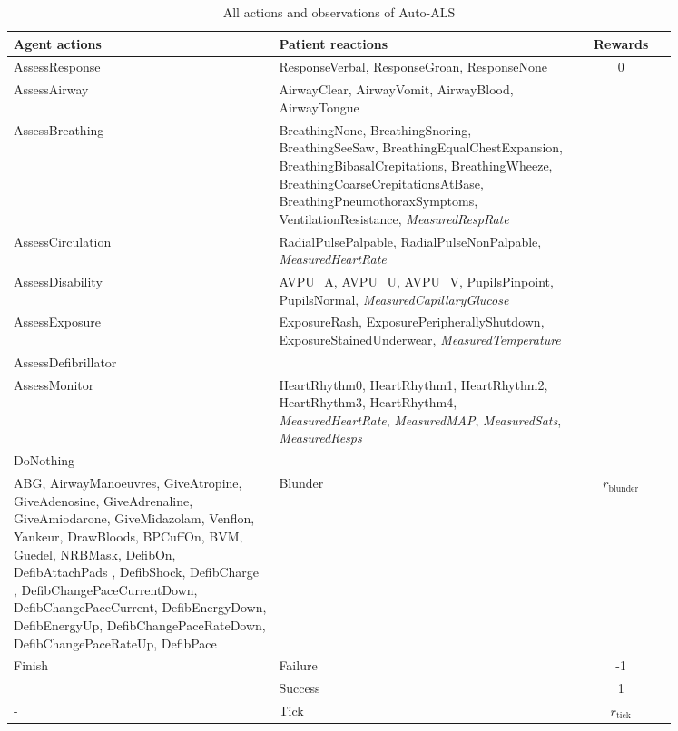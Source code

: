 \begin{table}[H]
\begin{tabular}{|p{0.4\linewidth}|p{0.45\linewidth}|c|}
\toprule
Agent actions &
  Patient reactions & Rewards
   \\
   \midrule
AssessResponse &
  ResponseVerbal,     ResponseGroan,     ResponseNone &
  \multirow{9}{*}{0} \\
AssessAirway &
  AirwayClear,     AirwayVomit,     AirwayBlood,     AirwayTongue &
   \\
AssessBreathing &
  BreathingNone,     BreathingSnoring,     BreathingSeeSaw,     BreathingEqualChestExpansion,     BreathingBibasalCrepitations,     BreathingWheeze,     BreathingCoarseCrepitationsAtBase,     BreathingPneumothoraxSymptoms,  VentilationResistance, \emph{MeasuredRespRate} &
   \\
AssessCirculation &
  RadialPulsePalpable,     RadialPulseNonPalpable, \emph{MeasuredHeartRate} &
   \\
AssessDisability &
  AVPU_A,     AVPU_U,     AVPU_V, PupilsPinpoint,     PupilsNormal, \emph{MeasuredCapillaryGlucose} &
   \\
AssessExposure &
  ExposureRash,     ExposurePeripherallyShutdown,     ExposureStainedUnderwear, \emph{MeasuredTemperature} &
   \\
AssessDefibrillator &
   &
   \\
AssessMonitor &
  HeartRhythm0,     HeartRhythm1,     HeartRhythm2,     HeartRhythm3,     HeartRhythm4, \emph{MeasuredHeartRate}, \emph{MeasuredMAP}, \emph{MeasuredSats}, \emph{MeasuredResps} &
   \\
   DoNothing & & \\
   \midrule
ABG,     AirwayManoeuvres,     GiveAtropine,     GiveAdenosine,     GiveAdrenaline,     GiveAmiodarone,     GiveMidazolam,     Venflon,     Yankeur,     DrawBloods,     BPCuffOn,     BVM,     Guedel,     NRBMask,     DefibOn,     DefibAttachPads ,     DefibShock,     DefibCharge ,     DefibChangePaceCurrentDown,     DefibChangePaceCurrent,     DefibEnergyDown,     DefibEnergyUp,     DefibChangePaceRateDown,     DefibChangePaceRateUp,     DefibPace& 
   Blunder & $r_\text{blunder}$
   \\
   \midrule
   \multirow{2}{*}{Finish} & Failure & -1 \\
   & Success & 1 \\
   \midrule
   - & Tick & $r_\text{tick}$ \\
  \bottomrule
\end{tabular}
\caption{All actions and observations of Auto-ALS}
\label{tab:auto-als}
\end{table}
